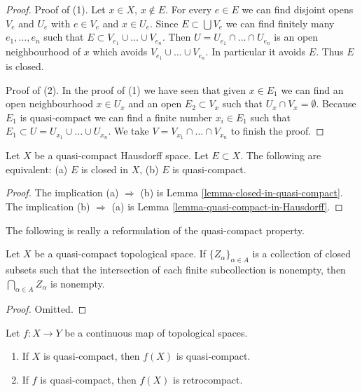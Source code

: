 \begin{proof}
Proof of (1). Let $x \in X$, $x \not \in E$.
For every $e \in E$ we can find disjoint opens $V_e$ and $U_e$
with $e \in V_e$ and $x \in U_e$. Since $E \subset \bigcup V_e$
we can find finitely many $e_1, \ldots, e_n$ such that
$E \subset V_{e_1} \cup \ldots \cup V_{e_n}$. Then
$U = U_{e_1} \cap \ldots \cap U_{e_n}$ is an open neighbourhood
of $x$ which avoids $V_{e_1} \cup \ldots \cup V_{e_n}$. In particular
it avoids $E$. Thus $E$ is closed.

\medskip\noindent
Proof of (2). In the proof of (1) we have seen that given $x \in E_1$
we can find an open neighbourhood $x \in U_x$ and an open
$E_2 \subset V_x$ such that $U_x \cap V_x = \emptyset$. Because
$E_1$ is quasi-compact we can find a finite number $x_i \in E_1$
such that $E_1 \subset U = U_{x_1} \cup \ldots \cup U_{x_n}$.
We take $V = V_{x_1} \cap \ldots \cap V_{x_n}$ to finish the proof.
\end{proof}

\begin{lemma}
\label{lemma-closed-in-compact}
Let $X$ be a quasi-compact Hausdorff space. Let $E \subset X$.
The following are equivalent: (a) $E$ is closed in $X$, (b)
$E$ is quasi-compact.
\end{lemma}

\begin{proof}
The implication (a) $\Rightarrow$ (b) is
Lemma \ref{lemma-closed-in-quasi-compact}.
The implication (b) $\Rightarrow$ (a) is
Lemma \ref{lemma-quasi-compact-in-Hausdorff}.
\end{proof}

\noindent
The following is really a reformulation of the
quasi-compact property.

\begin{lemma}
\label{lemma-intersection-closed-in-quasi-compact}
Let $X$ be a quasi-compact topological space.
If $\{Z_\alpha\}_{\alpha \in A}$ is a collection of closed subsets
such that the intersection of each finite subcollection
is nonempty, then $\bigcap_{\alpha \in A} Z_\alpha$ is nonempty.
\end{lemma}

\begin{proof}
Omitted.
\end{proof}

\begin{lemma}
\label{lemma-image-quasi-compact}
Let $f : X \to Y$ be a continuous map of topological spaces.
\begin{enumerate}
\item If $X$ is quasi-compact, then $f(X)$ is quasi-compact.
\item If $f$ is quasi-compact, then $f(X)$ is retrocompact.
\end{enumerate}
\end{lemma}

